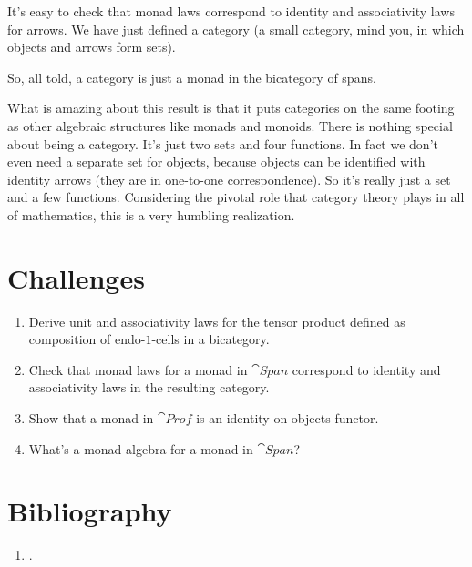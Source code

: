 It's easy to check that monad laws correspond to identity and
associativity laws for arrows. We have just defined a category (a small
category, mind you, in which objects and arrows form sets).

So, all told, a category is just a monad in the bicategory of spans.

What is amazing about this result is that it puts categories on the same
footing as other algebraic structures like monads and monoids. There is
nothing special about being a category. It's just two sets and four
functions. In fact we don't even need a separate set for objects,
because objects can be identified with identity arrows (they are in
one-to-one correspondence). So it's really just a set and a few
functions. Considering the pivotal role that category theory plays in
all of mathematics, this is a very humbling realization.

\section{Challenges}

\begin{enumerate}
\tightlist
\item
  Derive unit and associativity laws for the tensor product defined as
  composition of endo-$1$-cells in a bicategory.
\item
  Check that monad laws for a monad in $\cat{Span}$ correspond to
  identity and associativity laws in the resulting category.
\item
  Show that a monad in $\cat{Prof}$ is an identity-on-objects functor.
\item
  What's a monad algebra for a monad in $\cat{Span}$?
\end{enumerate}

\section{Bibliography}
\begin{enumerate}
  \tightlist
  \item
  .
\end{enumerate}
